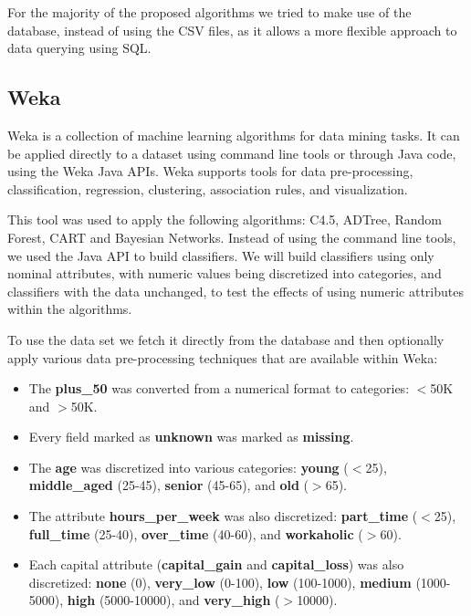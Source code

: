 \documentclass[a4paper]{llncs}
\begin{document}
For the majority of the proposed algorithms we tried to make use of the database, instead
of using the CSV files, as it allows a more flexible approach to data querying using SQL.

\subsection{Weka}
\label{sec:weka}

Weka is a collection of machine learning algorithms for data mining tasks. \cite{weka}
It can be applied directly to a dataset using command line tools or through Java code, using the Weka Java APIs.
Weka supports tools for data pre-processing, classification, regression, clustering, association rules,
and visualization.

This tool was used to apply the following algorithms: C4.5, ADTree, Random Forest, CART and Bayesian Networks.
Instead of using the command line tools, we used the Java API to build classifiers.
We will build classifiers using only nominal attributes, with numeric values being
discretized into categories, and classifiers with the data unchanged, to test
the effects of using numeric attributes within the algorithms.

To use the data set we fetch it directly from the database and then optionally
apply various data pre-processing techniques that are available within Weka:

\begin{itemize}
  \item The \textbf{plus\_50} was converted from a numerical format to categories: $<$50K and $>$50K.
  \item Every field marked as \textbf{unknown} was marked as \textbf{missing}.
  \item The \textbf{age} was discretized into various categories: \textbf{young} ($<$25),
    \textbf{middle\_aged} (25-45), \textbf{senior} (45-65), and \textbf{old} ($>$65).
  \item The attribute \textbf{hours\_per\_week} was also discretized: \textbf{part\_time} ($<$25),
    \textbf{full\_time} (25-40), \textbf{over\_time} (40-60), and \textbf{workaholic} ($>$60).
  \item Each capital attribute (\textbf{capital\_gain} and \textbf{capital\_loss}) was also discretized:
    \textbf{none} (0), \textbf{very\_low} (0-100), \textbf{low} (100-1000), \textbf{medium} (1000-5000),
    \textbf{high} (5000-10000), and \textbf{very\_high} ($>$10000).
\end{itemize}
\end{document}
